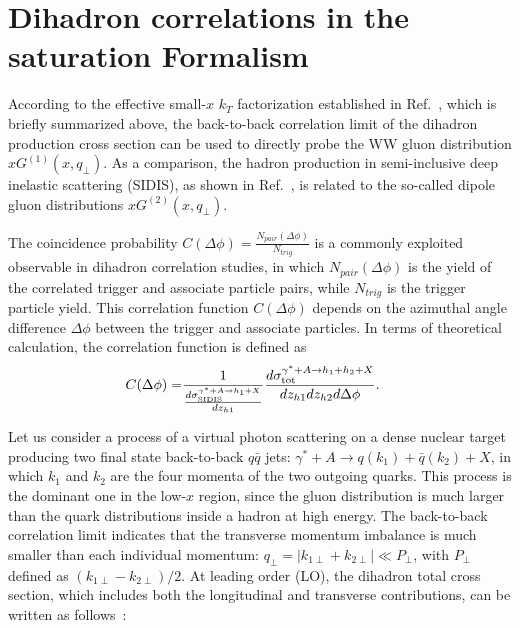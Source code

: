 \section{Dihadron correlations in the saturation Formalism}\label{sec:dihadrontheory}

According to the effective small-$x$ $k_T$ factorization established in
Ref.~\cite{Dominguez:2011wm}, which is briefly summarized above, the
back-to-back correlation limit of the dihadron production cross section can be used
to directly probe the WW gluon distribution $xG^{(1)}(x,q_{\perp})$. As a
comparison, the hadron production in semi-inclusive deep inelastic scattering
(SIDIS), as shown in Ref.~\cite{Marquet:2009ca}, is related to the so-called
dipole gluon distributions $xG^{(2)}(x,q_{\perp})$.

The coincidence probability $C(\Delta\phi)=\frac{N_{pair}(\Delta\phi)}{N_{trig}}$ is a
commonly exploited observable in dihadron correlation studies, in which
$N_{pair}(\Delta\phi)$ is the yield of the correlated trigger and associate
particle pairs, while $N_{trig}$ is the trigger particle yield. This
correlation function $C(\Delta\phi)$ depends on the azimuthal angle difference $\Delta\phi$
between the trigger and associate particles. In terms of theoretical
calculation, the correlation function is defined as
\begin{eqnarray} 
C(\Delta\phi) 
= & \frac{1}{\frac{d\sigma^{\gamma^{*}+A\rightarrow h_{1}+X}_{\textrm{SIDIS}}}{dz_{h1}}}
\frac{d\sigma^{\gamma^{*}+A\rightarrow h_{1}+h_{2}+X}_{\textrm{tot}}}{dz_{h1}dz_{h2}d\Delta\phi}.
\label{eqn:cdphiCGC} 
\end{eqnarray}

Let us consider a process of a virtual photon scattering on a dense nuclear target
producing two final state back-to-back $q\bar q$ jets:
$\gamma^{*}+A\rightarrow q(k_{1})+\bar{q}(k_{2})+X$, in which $k_1$ and $k_2$ are
the four momenta of the two outgoing quarks. This process is the
dominant one in the low-$x$ region, since the gluon distribution is much larger than
the quark distributions inside a hadron at high energy. The back-to-back correlation
limit indicates that the transverse momentum imbalance is much smaller than each
individual momentum: $q_{\perp}=|k_{1\perp}+k_{2\perp}|\ll P_{\perp}$, with
$P_{\perp}$ defined as $(k_{1\perp}-k_{2\perp})/2$. At leading order (LO), the
dihadron total cross section, which includes both the longitudinal and
transverse contributions, can be written as follows~\cite{Dominguez:2011wm}:

